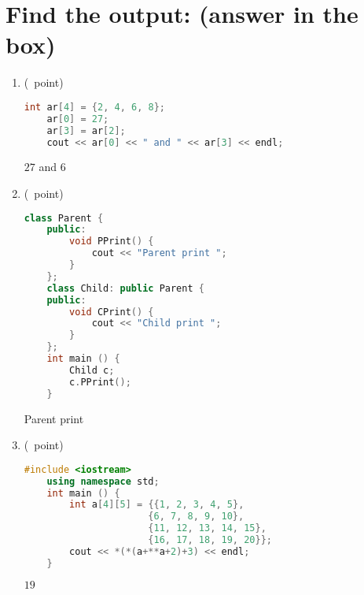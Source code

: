 \documentclass[14pt]{article}
\begin{document}
\section{Find the output: (answer in the box)}
\begin{enumerate}[label=\alph*)]
    \item (\textonequarter\ point)
    \begin{lstlisting}[language=C++, title={Part (a)}]
    int ar[4] = {2, 4, 6, 8};
    ar[0] = 27;
    ar[3] = ar[2];
    cout << ar[0] << " and " << ar[3] << endl;
    \end{lstlisting}
    \begin{myframe}[width=500pt,height=30pt,top=2pt,bottom=2.5pt,left=200pt,right=200pt,arc=10pt,auto outer arc]
    $27$ and $6$
    \end{myframe}
    
    \item (\textonequarter\ point)
    \begin{lstlisting}[language=C++, title={Part (b)}]
    class Parent {
    public:
        void PPrint() {
            cout << "Parent print ";
        }
    };
    class Child: public Parent {
    public:
        void CPrint() {
            cout << "Child print ";
        }
    };
    int main () {
        Child c;
        c.PPrint();
    }
    \end{lstlisting}
    \begin{myframe}[width=500pt,height=30pt,top=2pt,bottom=2.5pt,left=200pt,right=200pt,arc=10pt,auto outer arc]
    Parent print
    \end{myframe}
    \item (\textonequarter\ point)
    \begin{lstlisting}[language=C++, title={Part (c)}]
    #include <iostream>
    using namespace std;
    int main () {
        int a[4][5] = {{1, 2, 3, 4, 5},
                      {6, 7, 8, 9, 10},
                      {11, 12, 13, 14, 15},
                      {16, 17, 18, 19, 20}};
        cout << *(*(a+**a+2)+3) << endl;
    }
    \end{lstlisting}
    \begin{myframe}[width=500pt,height=20pt,top=2pt,bottom=2.5pt,left=200pt,right=200pt,arc=10pt,auto outer arc]
    $19$
    \end{myframe}
    

\end{enumerate}
\end{document}
